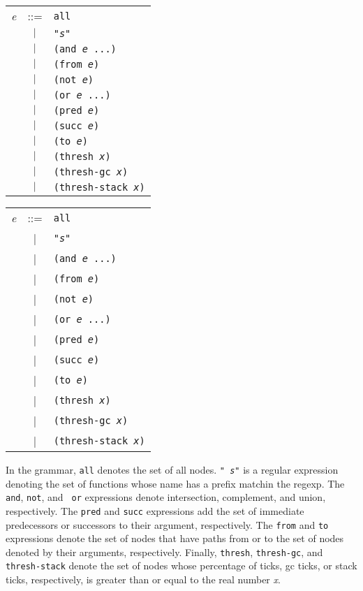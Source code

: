 \begin{latexonly}
\begin{center}
\begin{tabular}{lcl}
{\it e} & ::= & {\tt all} \\
& $\ |\ $ & {\tt "{\it s}"} \\
& $\ |\ $ & {\tt (and {\it e} ...)} \\
& $\ |\ $ & {\tt (from {\it e})} \\
& $\ |\ $ & {\tt (not {\it e})} \\
& $\ |\ $ & {\tt (or {\it e} ...)} \\
& $\ |\ $ & {\tt (pred {\it e})} \\
& $\ |\ $ & {\tt (succ {\it e})} \\
& $\ |\ $ & {\tt (to {\it e})} \\
& $\ |\ $ & {\tt (thresh {\it x})} \\
& $\ |\ $ & {\tt (thresh-gc {\it x})} \\
& $\ |\ $ & {\tt (thresh-stack {\it x})} \\
\end{tabular}
\end{center}
\end{latexonly}
\begin{htmlonly}
\begin{center}
\begin{tabular}{lcl}
{\it e} & ::= & {\tt all} \\
& | & {\tt "{\it s}"} \\
& | & {\tt (and {\it e} ...)} \\
& | & {\tt (from {\it e})} \\
& | & {\tt (not {\it e})} \\
& | & {\tt (or {\it e} ...)} \\
& | & {\tt (pred {\it e})} \\
& | & {\tt (succ {\it e})} \\
& | & {\tt (to {\it e})} \\
& | & {\tt (thresh {\it x})} \\
& | & {\tt (thresh-gc {\it x})} \\
& | & {\tt (thresh-stack {\it x})} \\
\end{tabular}
\end{center}
\end{htmlonly}

In the grammar, {\tt all} denotes the set of all nodes.  {\tt "{\it
s}"} is a regular expression denoting the set of functions whose name
has a prefix matchin the regexp.  The {\tt and}, {\tt not}, and {\tt
or} expressions denote intersection, complement, and union,
respectively.  The {\tt pred} and {\tt succ} expressions add the set
of immediate predecessors or successors to their argument,
respectively.  The {\tt from} and {\tt to} expressions denote the set
of nodes that have paths from or to the set of nodes denoted by their
arguments, respectively.  Finally, {\tt thresh}, {\tt thresh-gc}, and
{\tt thresh-stack} denote the set of nodes whose percentage of ticks,
gc ticks, or stack ticks, respectively, is greater than or equal to
the real number {\it x}.

